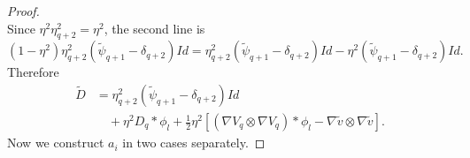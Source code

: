 \documentclass[reqno,12pt]{amsart}
\numberwithin{equation}{section}
\theoremstyle{plain}
\theoremstyle{definition}
\begin{document}
\begin{proof}
\begin{equation*}
\end{equation*}
Since $\eta^2\eta_{q+2}^2=\eta^2$, the second line is
\begin{equation*}
    (1-\eta^2)\eta_{q+2}^2(\tilde\psi_{q+1}-\delta_{q+2})Id = \eta_{q+2}^2(\tilde\psi_{q+1}-\delta_{q+2})Id - \eta^2(\tilde\psi_{q+1}-\delta_{q+2})Id.
\end{equation*}
Therefore
\begin{equation}
\begin{aligned}
    \tilde D &= \eta_{q+2}^2(\tilde\psi_{q+1} -\delta_{q+2})Id\\ &\quad +\eta^2 D_q*\phi_l +\frac{1}{2}\eta^2[(\nabla V_q\otimes\nabla V_q)*\phi_l-\nabla\tilde v\otimes\nabla\tilde v].
\end{aligned}
\end{equation}
Now we construct $a_i$ in two cases separately.


\end{proof}
\end{document}
